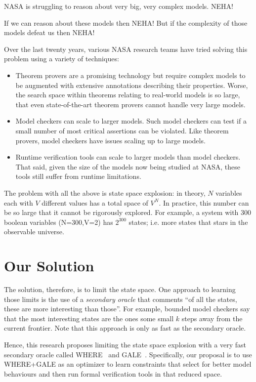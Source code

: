 \documentclass[12pt]{article}
\newcommand{\bi}{\begin{itemize}[leftmargin=0.5cm]}
\newcommand{\ei}{\end{itemize}}
\begin{document}
NASA is struggling to reason about very big, very complex models. NEHA! 

If we can reason about these models then NEHA! But if the complexity of those models
defeat us then NEHA!

Over the last twenty years, various
NASA research teams have tried solving this problem using a variety of techniques:
\bi
\item Theorem provers are a promising technology but require complex models to be augmented with extensive annotations describing their properties. Worse, the search space within theorems relating to real-world models is so large, that even state-of-the-art theorem provers cannot handle very large models.
\item Model checkers can scale to larger models. Such model checkers can test if a small number of most critical assertions can be violated. Like theorem provers, model checkers
have issues scaling up to large models.
\item Runtime verification tools can scale to larger models than model checkers. That
said, given the size of the models now being studied at NASA, these tools still suffer
from runtime limitations.
\ei
The problem with all the above is   state space explosion: in theory,
$N$ variables each with $V$ different values has a total space of $V^N$. In practice,
this number can be so large that it cannot be rigorously explored. For example, a system 
with 300 boolean variables (N=300,V=2) has $2^300$ states; i.e. more states that stars in the observable universe.

\section{Our Solution}

The solution, therefore, is to limit the state space. One approach to learning those limits
is the use of a {\em secondary oracle} that comments ``of all the states, these are more interesting than those''. For example, bounded model checkers say that the most interesting states are the ones some small $k$ steps away from the current frontier. Note that this approach is only as fast  as the secondary oracle.

Hence, this research proposes limiting the state space explosion with a very fast secondary oracle called WHERE~\cite{me12d} and GALE~\cite{krall2015gale}. 
Specifically, 
our proposal is to use WHERE+GALE as an optimizer to learn constraints that select for better model behaviours and then run formal verification tools in that reduced space.
\end{document}
